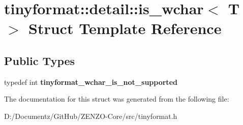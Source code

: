 \hypertarget{structtinyformat_1_1detail_1_1is__wchar}{}\section{tinyformat\+::detail\+::is\+\_\+wchar$<$ T $>$ Struct Template Reference}
\label{structtinyformat_1_1detail_1_1is__wchar}
\subsection*{Public Types}
\begin{DoxyCompactItemize}
\item 
\mbox{\label{structtinyformat_1_1detail_1_1is__wchar_a2006c700bf3264d6002993949bbaaac9}} 
typedef int {\bfseries tinyformat\+\_\+wchar\+\_\+is\+\_\+not\+\_\+supported}
\end{DoxyCompactItemize}


The documentation for this struct was generated from the following file\+:\begin{DoxyCompactItemize}
\item 
D\+:/\+Documentz/\+Git\+Hub/\+Z\+E\+N\+Z\+O-\/\+Core/src/tinyformat.\+h\end{DoxyCompactItemize}
